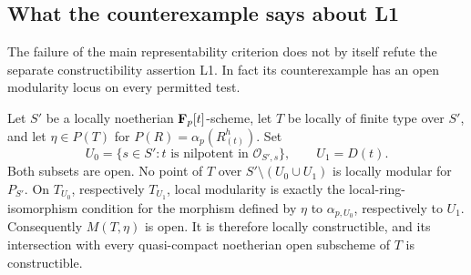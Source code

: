 \subsection{What the counterexample says about L1}

The failure of the main representability criterion does not by itself
refute the separate constructibility assertion L1.  In fact its
counterexample has an open modularity locus on every permitted test.

\begin{proposition}
\label{A:hensel-L1-open}
Let $S'$ be a locally noetherian $\mathbf F_p[t]$-scheme, let $T$ be
locally of finite type over $S'$, and let $\eta\in P(T)$ for
$P(R)=\alpha_p(R^h_{(t)})$.  Set
\[
 U_0=\{s\in S':t\text{ is nilpotent in }\mathcal O_{S',s}\},
 \qquad U_1=D(t).
\]
Both subsets are open.  No point of $T$ over
$S'\setminus(U_0\cup U_1)$ is locally modular for $P_{S'}$.
On $T_{U_0}$, respectively $T_{U_1}$, local modularity is exactly
the local-ring-isomorphism condition for the morphism defined by
$\eta$ to $\alpha_{p,U_0}$, respectively to $U_1$.
Consequently $M(T,\eta)$ is open.  It is therefore locally
constructible, and its intersection with every quasi-compact
noetherian open subscheme of $T$ is constructible.
\end{proposition}
